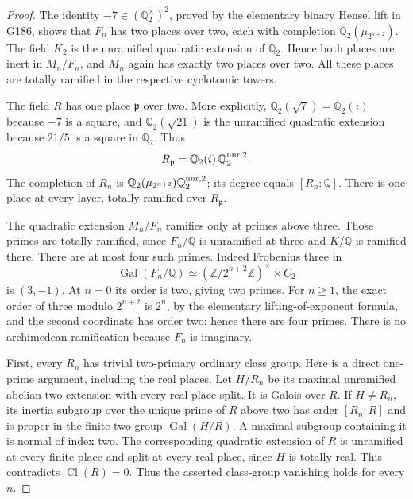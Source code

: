 \begin{proof}
The identity $-7\in(\mathbb Q_2^\times)^2$, proved by the
elementary binary Hensel lift in G186, shows that $F_n$ has two
places over two, each with completion $\mathbb Q_2(\mu_{2^{n+2}})$.
The field $K_2$ is the unramified quadratic extension of
$\mathbb Q_2$.  Hence both places are inert in $M_n/F_n$,
and $M_n$ again has exactly two places over two.
All these places are totally ramified in the respective
cyclotomic towers.

The field $R$ has one place $\mathfrak p$ over two.  More explicitly,
$\mathbb Q_2(\sqrt7)=\mathbb Q_2(i)$ because $-7$ is a square,
and $\mathbb Q_2(\sqrt{21})$ is the unramified quadratic
extension because $21/5$ is a square in $\mathbb Q_2$.
Thus
\[
 R_{\mathfrak p}=\mathbb Q_2(i)\,\mathbb Q_2^{\rm unr,2}.
\]
The completion of $R_n$ is
$\mathbb Q_2(\mu_{2^{n+2}})\mathbb Q_2^{\rm unr,2}$;
its degree equals $[R_n:\mathbb Q]$.  There is one place
at every layer, totally ramified over $R_{\mathfrak p}$.

The quadratic extension $M_n/F_n$ ramifies only at primes above
three.  Those primes are totally ramified, since $F_n/\mathbb Q$
is unramified at three and $K/\mathbb Q$ is ramified there.
There are at most four such primes.  Indeed Frobenius three in
\[
 \operatorname{Gal}(F_n/\mathbb Q)
   \simeq(\mathbb Z/2^{n+2}\mathbb Z)^\times\times C_2
\]
is $(3,-1)$.  At $n=0$ its order is two, giving two primes.
For $n\geq1$, the exact order of three modulo $2^{n+2}$ is
$2^n$, by the elementary lifting-of-exponent formula, and the
second coordinate has order two; hence there are four primes.
There is no archimedean ramification because $F_n$ is imaginary.

First, every $R_n$ has trivial two-primary ordinary class group.
Here is a direct one-prime argument, including the real places.
Let $H/R_n$ be its maximal unramified abelian two-extension
with every real place split.  It is Galois over $R$.
If $H\ne R_n$, its inertia subgroup over the unique prime of
$R$ above two has order $[R_n:R]$ and is proper in the finite
two-group $\operatorname{Gal}(H/R)$.
A maximal subgroup containing it is normal of index two.
The corresponding quadratic extension of $R$ is unramified at
every finite place and split at every real place, since $H$ is
totally real.  This contradicts $\operatorname{Cl}(R)=0$.
Thus the asserted class-group vanishing holds for every $n$.


\end{proof}
